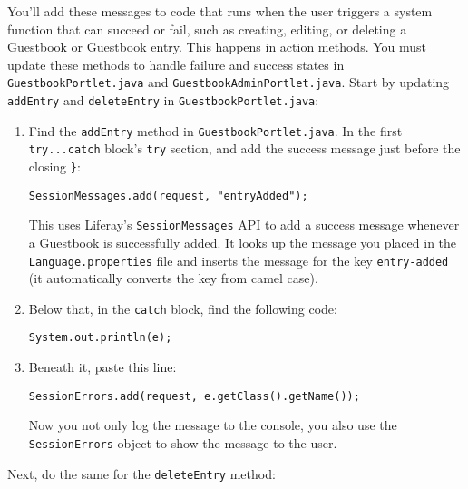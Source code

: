You'll add these messages to code that runs when the user triggers a
system function that can succeed or fail, such as creating, editing, or
deleting a Guestbook or Guestbook entry. This happens in action methods.
You must update these methods to handle failure and success states in
\texttt{GuestbookPortlet.java} and \texttt{GuestbookAdminPortlet.java}.
Start by updating \texttt{addEntry} and \texttt{deleteEntry} in
\texttt{GuestbookPortlet.java}:

\begin{enumerate}
\def\labelenumi{\arabic{enumi}.}
\item
  Find the \texttt{addEntry} method in \texttt{GuestbookPortlet.java}.
  In the first \texttt{try...catch} block's \texttt{try} section, and
  add the success message just before the closing \texttt{\}}:

\begin{verbatim}
SessionMessages.add(request, "entryAdded");
\end{verbatim}

  This uses Liferay's \texttt{SessionMessages} API to add a success
  message whenever a Guestbook is successfully added. It looks up the
  message you placed in the \texttt{Language.properties} file and
  inserts the message for the key \texttt{entry-added} (it automatically
  converts the key from camel case).
\item
  Below that, in the \texttt{catch} block, find the following code:

\begin{verbatim}
System.out.println(e);
\end{verbatim}
\item
  Beneath it, paste this line:

\begin{verbatim}
SessionErrors.add(request, e.getClass().getName());
\end{verbatim}

  Now you not only log the message to the console, you also use the
  \texttt{SessionErrors} object to show the message to the user.
\end{enumerate}

Next, do the same for the \texttt{deleteEntry} method:

